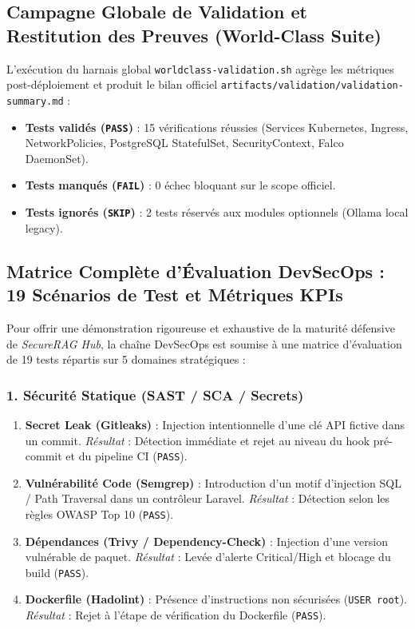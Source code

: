 \subsection{Campagne Globale de Validation et Restitution des Preuves (World-Class Suite)}

L'exécution du harnais global \texttt{worldclass-validation.sh} agrège les métriques post-déploiement et produit le bilan officiel \texttt{artifacts/validation/validation-summary.md} :
\begin{itemize}
    \item \textbf{Tests validés (\texttt{PASS})} : 15 vérifications réussies (Services Kubernetes, Ingress, NetworkPolicies, PostgreSQL StatefulSet, SecurityContext, Falco DaemonSet).
    \item \textbf{Tests manqués (\texttt{FAIL})} : 0 échec bloquant sur le scope officiel.
    \item \textbf{Tests ignorés (\texttt{SKIP})} : 2 tests réservés aux modules optionnels (Ollama local legacy).
\end{itemize}

\subsection{Matrice Complète d'Évaluation DevSecOps : 19 Scénarios de Test et Métriques KPIs}
\label{sub:matrice_19_tests_devsecops}

Pour offrir une démonstration rigoureuse et exhaustive de la maturité défensive de \textit{SecureRAG Hub}, la chaîne DevSecOps est soumise à une matrice d'évaluation de 19 tests répartis sur 5 domaines stratégiques :

\subsubsection{1. Sécurité Statique (SAST / SCA / Secrets)}
\begin{enumerate}
    \item \textbf{Secret Leak (Gitleaks)} : Injection intentionnelle d'une clé API fictive dans un commit. \textit{Résultat} : Détection immédiate et rejet au niveau du hook pré-commit et du pipeline CI (\texttt{PASS}).
    \item \textbf{Vulnérabilité Code (Semgrep)} : Introduction d'un motif d'injection SQL / Path Traversal dans un contrôleur Laravel. \textit{Résultat} : Détection selon les règles OWASP Top 10 (\texttt{PASS}).
    \item \textbf{Dépendances (Trivy / Dependency-Check)} : Injection d'une version vulnérable de paquet. \textit{Résultat} : Levée d'alerte Critical/High et blocage du build (\texttt{PASS}).
    \item \textbf{Dockerfile (Hadolint)} : Présence d'instructions non sécurisées (\texttt{USER root}). \textit{Résultat} : Rejet à l'étape de vérification du Dockerfile (\texttt{PASS}).
\end{enumerate}

